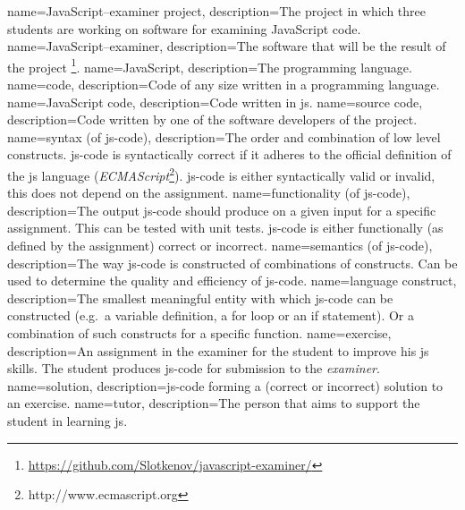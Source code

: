 {
  name=JavaScript--examiner project,
  description={The project in which three students are working
    on software for examining JavaScript code.}
}
{
  name=JavaScript--examiner,
  description={The software that will be the result of the \gls{project}
    \footnote{\url{https://github.com/Slotkenov/javascript-examiner/}}.}
}
{
  name=JavaScript,
  description={The programming language.}
}
{
  name=code,
  description={Code of any size written in a programming language.}
}
{
  name=JavaScript code,
  description={Code written in \gls{js}.}
}
{
  name=source code,
  description={Code written by one of the software developers
    of the \gls{project}.}
}
{
  name=syntax (of \gls{js-code}),
  description={The order and combination of low level \glspl{construct}.
    \gls{js-code} is syntactically correct if it adheres
    to the official definition of the \gls{js} language
    ({\em ECMAScript}\footnote{http://www.ecmascript.org}).
    \gls{js-code} is either syntactically valid or invalid,
    this does not depend on the assignment.}
}
{
  name=functionality (of \gls{js-code}),
  description={The output \gls{js-code} should produce
    on a given input for a specific assignment.
    This can be tested with unit tests.
    \Gls{js-code} is either functionally (as defined by the assignment)
    correct or incorrect.}
}
{
  name=semantics (of \gls{js-code}),
  description={The way \gls{js-code} is constructed
    of combinations of \glspl{construct}.
    Can be used to determine the quality and efficiency of \gls{js-code}.}
}
{
  name=language construct,
  description={The smallest meaningful entity
    with which \gls{js-code} can be constructed
    (e.g.\ a variable definition, a for loop or an if statement).
    Or a combination of such \glspl{construct} for a specific function.}
}
{
  name=exercise,
  description={An assignment in the \gls{examiner} for the \gls{student}
    to improve his \gls{js} skills.
    The student produces \gls{js-code} for submission to the {\em examiner}.}
}
{
  name=solution,
  description={\Gls{js-code} forming a
    (correct or incorrect) solution to an exercise.}
}
{
  name=tutor,
  description={The person that aims to support the \gls{student}
    in learning \gls{js}.}
}
